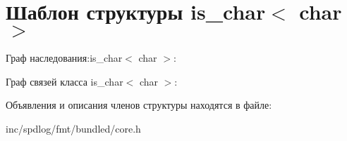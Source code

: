 \hypertarget{structis__char_3_01char_01_4}{}\section{Шаблон структуры is\+\_\+char$<$ char $>$}
\label{structis__char_3_01char_01_4}


Граф наследования\+:is\+\_\+char$<$ char $>$\+:


Граф связей класса is\+\_\+char$<$ char $>$\+:


Объявления и описания членов структуры находятся в файле\+:\begin{DoxyCompactItemize}
\item 
inc/spdlog/fmt/bundled/core.\+h\end{DoxyCompactItemize}
